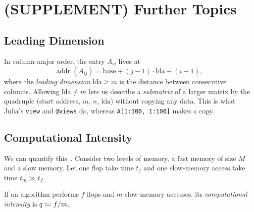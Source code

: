 \section{(SUPPLEMENT) Further Topics}
\label{sec:perf-further}
\subsection{Leading Dimension}

In column-major order, the entry $A_{ij}$ lives at
\begin{equation}
  \operatorname{addr}(A_{ij}) = \text{base} + (j - 1) \cdot \mathrm{lda} + (i - 1),
\end{equation}
where the \emph{leading dimension} $\mathrm{lda} \ge m$ is the distance between consecutive columns. Allowing $\mathrm{lda} \ne m$ lets us describe a \emph{submatrix} of a larger matrix by the quadruple (start address, $m$, $n$, $\mathrm{lda}$) without copying any data. This is what Julia's \texttt{view} and \texttt{@views} do, whereas \texttt{A[1:100, 1:100]} makes a copy.

\subsection{Computational Intensity}
\label{sec:intensity}

We can quantify this~\cite[\S2.6]{Demmel}. Consider two levels of memory, a fast memory of size $M$ and a slow memory. Let one flop take time $t_f$ and one slow-memory access take time $t_m \gg t_f$.

\begin{definition}
  If an algorithm performs $f$ flops and $m$ slow-memory accesses, its \emph{computational intensity} is $q \coloneqq f/m$.
\end{definition}

